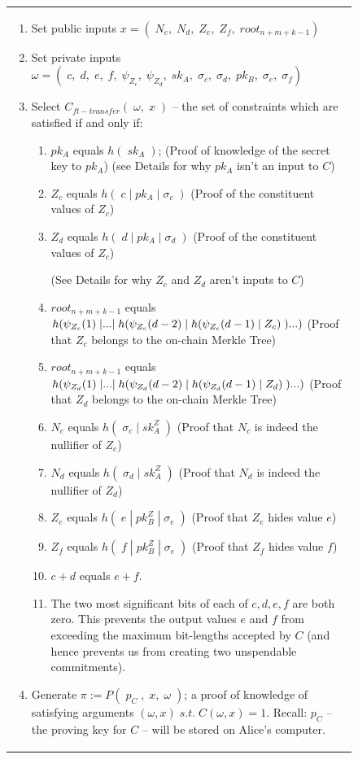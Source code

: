 \documentclass{article}
\DeclarePairedDelimiter\br{(}{)}
\begin{document}
\begin{figure}[H]
\begin{center}
\begin{framed}
\begin{tabular}{p{16cm}}
\begin{enumerate}
          \item Set public inputs $x = (\;N_c,\;N_d,\;Z_e,\;Z_f,\;root_{n+m+k-1})$
          \item Set private inputs $\omega = (\;c,\;d,\;e,\;f,\;\psi_{Z_c},\;\psi_{Z_d},\;sk_A,\;\sigma_c,\;\sigma_d,\;pk_B,\;\sigma_e,\;\sigma_f)$
          \item Select $C_{ft-transfer}(\;\omega,\;x\;)$ -- the set of constraints which are satisfied if and only if:
          \begin{enumerate}
            \item $pk_A$ equals $h(\;sk_A\;)$; (Proof of knowledge of the secret key to $pk_A$) (see Details for why $pk_A$ isn't an input to $C$)
            \item $Z_c$ equals $h(\;c\;|\;pk_A\;|\;\sigma_c\;)$ (Proof of the constituent values of $Z_c$)
            \item $Z_d$ equals $h(\;d\;|\;pk_A\;|\;\sigma_d\;)$ (Proof of the constituent values of $Z_c$)

            (See Details for why $Z_c$ and $Z_d$ aren't inputs to $C$)
            \item $root_{n+m+k-1}$ equals $h\br*{\psi_{Z_c}(1)\;|...|\;h\br*{\psi_{Z_c}(d-2)\;|\;h\br*{\psi_{Z_c}(d-1)\;|\;Z_c}\;}...}$ (Proof that $Z_c$ belongs to the on-chain Merkle Tree)
            \item $root_{n+m+k-1}$ equals $h\br*{\psi_{Z_d}(1)\;|...|\;h\br*{\psi_{Z_d}(d-2)\;|\;h\br*{\psi_{Z_d}(d-1)\;|\;Z_d}\;}...}$ (Proof that $Z_d$ belongs to the on-chain Merkle Tree)
            \item $N_c$ equals $h(\;\sigma_c\;|\;sk^Z_A\;)$ (Proof that $N_c$ is indeed the nullifier of $Z_c$)
            \item $N_d$ equals $h(\;\sigma_d\;|\;sk^Z_A\;)$ (Proof that $N_d$ is indeed the nullifier of $Z_d$)
            \item $Z_e$ equals $h(\;e\;|\;pk^Z_B\;|\;\sigma_e\;)$ (Proof that $Z_e$ hides value $e$)
            \item $Z_f$ equals $h(\;f\;|\;pk^Z_B\;|\;\sigma_e\;)$ (Proof that $Z_f$ hides value $f$)
            \item $c + d$ equals $e + f$.
            \item The two most significant bits of each of $c, d, e, f$ are both zero. This prevents the output values $e$ and $f$ from exceeding the maximum bit-lengths accepted by $C$ (and hence prevents us from creating two unspendable commitments).
          \end{enumerate}
          \item Generate $\pi := P(\;p_C\;,\;x,\;\omega\;)$; a proof of knowledge of satisfying arguments $(\omega, x)\;s.t.\;C(\omega, x) = 1$. Recall: $p_C$ -- the proving key for $C$ -- will be stored on Alice's computer.


\end{enumerate}
\end{tabular}
\end{framed}
\end{center}
\end{figure}
\end{document}
